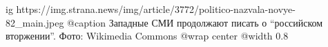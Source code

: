  
 
 
 
 

\ifcmt
  ig https://img.strana.news/img/article/3772/politico-nazvala-novye-82_main.jpeg
  @caption Западные СМИ продолжают писать о \enquote{российском вторжении}. Фото: Wikimedia Commons 
  @wrap center
  @width 0.8
\fi
